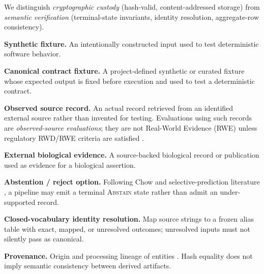 We distinguish \emph{cryptographic custody} (hash-valid, content-addressed storage) from \emph{semantic verification} (terminal-state invariants, identity resolution, aggregate-row consistency).

\textbf{Synthetic fixture.} An intentionally constructed input used to test deterministic software behavior.

\textbf{Canonical contract fixture.} A project-defined synthetic or curated fixture whose expected output is fixed before execution and used to test a deterministic contract.

\textbf{Observed source record.} An actual record retrieved from an identified external source rather than invented for testing. Evaluations using such records are \emph{observed-source evaluations}; they are not Real-World Evidence (RWE) unless regulatory RWD/RWE criteria are satisfied \cite{fda_rwe}.

\textbf{External biological evidence.} A source-backed biological record or publication used as evidence for a biological assertion.

\textbf{Abstention / reject option.} Following Chow \cite{chow1970} and selective-prediction literature \cite{geifman2017}, a pipeline may emit a terminal \textsc{Abstain} state rather than admit an under-supported record.

\textbf{Closed-vocabulary identity resolution.} Map source strings to a frozen alias table with exact, mapped, or unresolved outcomes; unresolved inputs must not silently pass as canonical.

\textbf{Provenance.} Origin and processing lineage of entities \cite{prov_dm}. Hash equality does not imply semantic consistency between derived artifacts.
